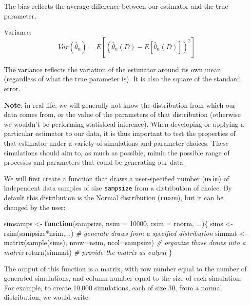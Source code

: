 \documentclass[
]{book}
\newenvironment{Shaded}{\begin{snugshade}}{\end{snugshade}}
\newcommand{\AttributeTok}[1]{\textcolor[rgb]{0.77,0.63,0.00}{#1}}
\newcommand{\CommentTok}[1]{\textcolor[rgb]{0.56,0.35,0.01}{\textit{#1}}}
\newcommand{\ControlFlowTok}[1]{\textcolor[rgb]{0.13,0.29,0.53}{\textbf{#1}}}
\newcommand{\DecValTok}[1]{\textcolor[rgb]{0.00,0.00,0.81}{#1}}
\newcommand{\FunctionTok}[1]{\textcolor[rgb]{0.00,0.00,0.00}{#1}}
\newcommand{\NormalTok}[1]{#1}
\newcommand{\OtherTok}[1]{\textcolor[rgb]{0.56,0.35,0.01}{#1}}
\newcommand{\SpecialCharTok}[1]{\textcolor[rgb]{0.00,0.00,0.00}{#1}}
\begin{document}
The bias reflects the average difference between our estimator and the true parameter.

Variance: \[Var(\hat\theta_n) =  E[ (\hat\theta_n(D) - E[\hat\theta_n(D)] )^2] \]

The variance reflects the variation of the estimator around its own mean (regardless of what the true parameter is). It is also the square of the standard error.

\textbf{Note}: in real life, we will generally not know the distribution from which our data comes from, or the value of the parameters of that distribution (otherwise we wouldn't be performing statistical inference). When developing or applying a particular estimator to our data, it is thus important to test the properties of that estimator under a variety of simulations and parameter choices. These simulations should aim to, as much as possible, mimic the possible range of processes and parameters that could be generating our data.

We will first create a function that draws a user-specified number (\texttt{nsim}) of independent data samples of size \texttt{sampsize} from a distribution of choice. By default this distribution is the Normal distribution (\texttt{rnorm}), but it can be changed by the user:

\begin{Shaded}
\begin{Highlighting}[]
\NormalTok{simsamps }\OtherTok{\textless{}{-}} \ControlFlowTok{function}\NormalTok{(sampsize, }\AttributeTok{nsim =} \DecValTok{10000}\NormalTok{, }\AttributeTok{rsim =}\NormalTok{ rnorm, ...)\{}
\NormalTok{  sims }\OtherTok{\textless{}{-}} \FunctionTok{rsim}\NormalTok{(sampsize}\SpecialCharTok{*}\NormalTok{nsim,...) }\CommentTok{\# generate draws from a specified distribution}
\NormalTok{  simmat }\OtherTok{\textless{}{-}} \FunctionTok{matrix}\NormalTok{(}\FunctionTok{sample}\NormalTok{(sims), }\AttributeTok{nrow=}\NormalTok{nsim, }\AttributeTok{ncol=}\NormalTok{sampsize) }\CommentTok{\# organize those draws into a matrix}
  \FunctionTok{return}\NormalTok{(simmat) }\CommentTok{\# provide the matrix as output}
\NormalTok{\}}
\end{Highlighting}
\end{Shaded}

The output of this function is a matrix, with row number equal to the number of generated simulations, and column number equal to the size of each simulation. For example, to create 10,000 simulations, each of size 30, from a normal distribution, we would write:
\end{document}
